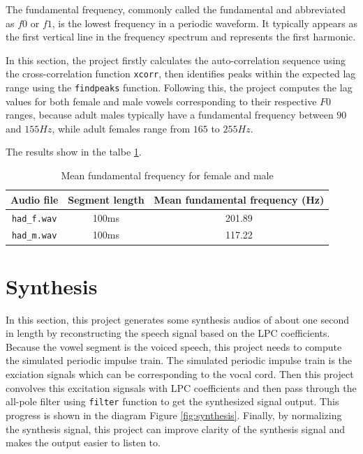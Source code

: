 \documentclass{article}
\begin{document}
The fundamental frequency, commonly called the fundamental and abbreviated as $f0$ or $f1$, is the lowest frequency in a periodic waveform. It typically appears as the first vertical line in the frequency spectrum and represents the first harmonic.

In this section, the project firstly calculates the auto-correlation sequence using the cross-correlation function \verb+xcorr+, then identifies peaks within the expected lag range using the \verb+findpeaks+ function. Following this, the project computes the lag values for both female and male vowels corresponding to their respective $F0$ ranges, because adult males typically have a fundamental frequency between $90$ and $155 Hz$, while adult females range from $165$ to $255 Hz$\citep{baken2000clinical}.

The results show in the talbe \ref{table:mean-fundamental-frequency}.

\begin{table}[ht]
\caption{Mean fundamental frequency for female and male} %
\centering %
\begin{tabular}{c c c} %
\hline\hline %
Audio file & Segment length & Mean fundamental frequency (Hz) \\ [0.5ex] %
\hline %
\verb+had_f.wav+ & 100ms & 201.89 \\ %
\verb+had_m.wav+ & 100ms & 117.22 \\ [1ex] %
\hline %
\end{tabular}
\label{table:mean-fundamental-frequency}
\end{table}

\section{Synthesis}

In this section, this project generates some synthesis audios of about one second in length by reconstructing the speech signal based on the LPC coefficients. Because the vowel segment is the voiced speech, this project needs to compute the simulated periodic impulse train. The simulated periodic impulse train is the exciation signals which can be corresponding to the vocal cord. Then this project convolves this excitation signsals with LPC coefficients and then pass through the all-pole filter using \verb+filter+ function to get the synthesized signal output\citep{EEEM030}. This progress is shown in the diagram Figure \ref{fig:synthesis}. Finally, by normalizing the synthesis signal, this project can improve clarity of the synthesis signal and makes the output easier to listen to.
\end{document}

